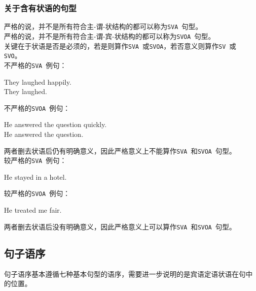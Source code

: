 \documentclass[UTF8]{ctexart}
\begin{document}
\subsubsection{关于含有状语的句型}
    严格的说，并不是所有符合主-谓-状结构的都可以称为\texttt{SVA~}句型。\\[3mm]
    严格的说，并不是所有符合主-谓-宾-状结构的都可以称为\texttt{SVOA~}句型。\\[3mm]
    关键在于状语是否是必须的，若是则算作\texttt{SVA~}或\texttt{SVOA}，若否意义则算作\texttt{SV~}或\texttt{SVO}。\\[8mm]
    不严格的\texttt{SVA~}例句：\vspace{-10pt}
    \begin{center}
        \large
        \ttfamily
        They laughed happily.\\[3mm]
        They laughed.\\[4mm]
    \end{center}
    不严格的\texttt{SVOA~}例句：\vspace{-5pt}
    \begin{center}
        \large
        \ttfamily
        He answered the question quickly.\\[3mm]
        He answered the question.\\[4mm]
    \end{center}
    两者删去状语后仍有明确意义，因此严格意义上不能算作\texttt{SVA~}和\texttt{SVOA~}句型。\\[12mm]
    较严格的\texttt{SVA~}例句：\vspace{-5pt}
    \begin{center}
        \large
        \ttfamily
        He stayed in a hotel.\\[4mm]
    \end{center}
    较严格的\texttt{SVOA~}例句：\vspace{-5pt}
    \begin{center}
        \large
        \ttfamily
        He treated me fair.\\[4mm]
    \end{center}
    两者删去状语后没有明确意义，因此严格意义上可以算作\texttt{SVA~}和\texttt{SVOA~}句型。

\newpage

\subsection{句子语序}
    句子语序基本遵循七种基本句型的语序，需要进一步说明的是宾语定语状语在句中的位置。
\end{document}
